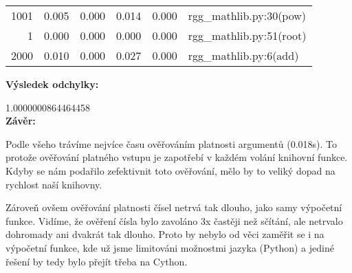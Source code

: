 \documentclass[11pt,a4paper]{article}
\begin{document}
\begin{table}[h]
\begin{tabular}{|r|r|r|r|r|l|}
			1001                                  & 0.005                                 & 0.000                                 & 0.014                                 & 0.000                                 & rgg\_mathlib.py:30(pow)               \\ 
			1                                     & 0.000                                 & 0.000                                 & 0.000                                 & 0.000                                 & rgg\_mathlib.py:51(root)              \\ 
			2000                                  & 0.010                                 & 0.000                                 & 0.027                                 & 0.000                                 & rgg\_mathlib.py:6(add)                \\ \hline
		\end{tabular}
	\end{table}
	\vspace{1em}
	
	\textbf{Výsledek odchylky:}
	
	\hspace{20pt} 1.0000000864464458
	\vspace{1.5em}\\
	\textbf{Závěr:}
	
	\setlength{\parindent}{20pt}
	Podle všeho trávíme nejvíce času ověřováním platnosti argumentů (0.018s). To protože ověřování
	platného vstupu je zapotřebí v každém volání knihovní funkce. Kdyby se nám podařilo zefektivnit toto
	ověřování, mělo by to veliký dopad na rychlost naší knihovny.
	
	Zároveň ovšem ověřování platnosti čísel netrvá tak dlouho, jako samy výpočetní funkce. Vidíme, že
	ověření čísla bylo zavoláno 3x častěji než sčítání, ale netrvalo dohromady ani dvakrát tak dlouho. Proto
	by nebylo od věci zaměřit se i na výpočetní funkce, kde už jsme limitováni možnostmi jazyka (Python) a
	jediné řešení by tedy bylo přejít třeba na Cython.
	
\end{document}
